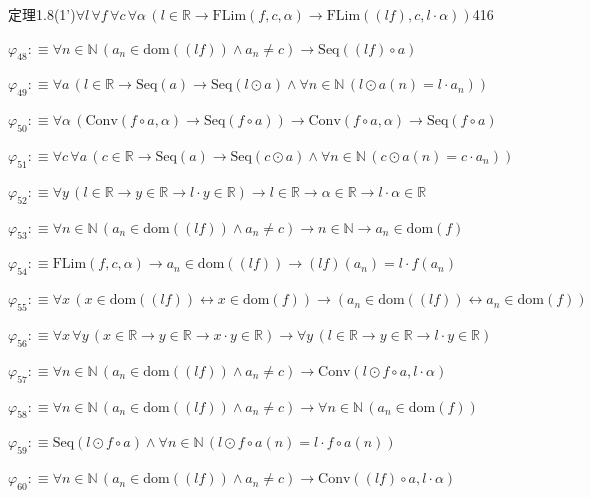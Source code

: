 \begin{fullproof}{定理1.8(1')}{$\forall l\,\forall f\,\forall c\,\forall \alpha\,(l \in \mathbb{R} \to \mathrm{FLim}(f,c,\alpha) \to \mathrm{FLim}((l f),c,l \cdot \alpha))$}{416}
\begin{abbrevlist}
\item $\varphi_{48} :\equiv \forall n \in \mathbb{N}\,(a_{n} \in \mathrm{dom}((l f)) \land a_{n} \neq c) \to \mathrm{Seq}((l f) \circ a)$
\item $\varphi_{49} :\equiv \forall a\,(l \in \mathbb{R} \to \mathrm{Seq}(a) \to \mathrm{Seq}(l \odot a) \land \forall n \in \mathbb{N}\,(l \odot a(n) = l \cdot a_{n}))$
\item $\varphi_{50} :\equiv \forall \alpha\,(\mathrm{Conv}(f \circ a,\alpha) \to \mathrm{Seq}(f \circ a)) \to \mathrm{Conv}(f \circ a,\alpha) \to \mathrm{Seq}(f \circ a)$
\item $\varphi_{51} :\equiv \forall c\,\forall a\,(c \in \mathbb{R} \to \mathrm{Seq}(a) \to \mathrm{Seq}(c \odot a) \land \forall n \in \mathbb{N}\,(c \odot a(n) = c \cdot a_{n}))$
\item $\varphi_{52} :\equiv \forall y\,(l \in \mathbb{R} \to y \in \mathbb{R} \to l \cdot y \in \mathbb{R}) \to l \in \mathbb{R} \to \alpha \in \mathbb{R} \to l \cdot \alpha \in \mathbb{R}$
\item $\varphi_{53} :\equiv \forall n \in \mathbb{N}\,(a_{n} \in \mathrm{dom}((l f)) \land a_{n} \neq c) \to n \in \mathbb{N} \to a_{n} \in \mathrm{dom}(f)$
\item $\varphi_{54} :\equiv \mathrm{FLim}(f,c,\alpha) \to a_{n} \in \mathrm{dom}((l f)) \to (l f)(a_{n}) = l \cdot f(a_{n})$
\item $\varphi_{55} :\equiv \forall x\,(x \in \mathrm{dom}((l f)) \leftrightarrow x \in \mathrm{dom}(f)) \to (a_{n} \in \mathrm{dom}((l f)) \leftrightarrow a_{n} \in \mathrm{dom}(f))$
\item $\varphi_{56} :\equiv \forall x\,\forall y\,(x \in \mathbb{R} \to y \in \mathbb{R} \to x \cdot y \in \mathbb{R}) \to \forall y\,(l \in \mathbb{R} \to y \in \mathbb{R} \to l \cdot y \in \mathbb{R})$
\item $\varphi_{57} :\equiv \forall n \in \mathbb{N}\,(a_{n} \in \mathrm{dom}((l f)) \land a_{n} \neq c) \to \mathrm{Conv}(l \odot f \circ a,l \cdot \alpha)$
\item $\varphi_{58} :\equiv \forall n \in \mathbb{N}\,(a_{n} \in \mathrm{dom}((l f)) \land a_{n} \neq c) \to \forall n \in \mathbb{N}\,(a_{n} \in \mathrm{dom}(f))$
\item $\varphi_{59} :\equiv \mathrm{Seq}(l \odot f \circ a) \land \forall n \in \mathbb{N}\,(l \odot f \circ a(n) = l \cdot f \circ a(n))$
\item $\varphi_{60} :\equiv \forall n \in \mathbb{N}\,(a_{n} \in \mathrm{dom}((l f)) \land a_{n} \neq c) \to \mathrm{Conv}((l f) \circ a,l \cdot \alpha)$

\end{abbrevlist}
\end{fullproof}
